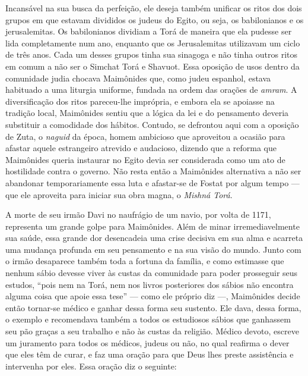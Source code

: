 Incansável na sua busca da perfeição, ele deseja também unificar os
ritos dos dois grupos em que estavam divididos os judeus do Egito, ou
seja, os babilonianos e os jerusalemitas. Os babilonianos dividiam a
Torá de maneira que ela pudesse ser lida completamente num ano,
enquanto que os Jerusalemitas utilizavam um ciclo de três anos. Cada um
desses grupos tinha sua sinagoga e não tinha outros ritos em comum a
não ser o Simchat Torá e Shavuot. Essa oposição de usos dentro da
comunidade judia chocava Maimônides que, como judeu espanhol, estava
habituado a uma liturgia uniforme, fundada na ordem das orações de
\emph{amram}. A diversificação dos ritos pareceu-lhe imprópria, e embora ela se
apoiasse na tradição local, Maimônides sentiu que a lógica da lei e do
pensamento deveria substituir a comodidade dos hábitos. Contudo, se
defrontou aqui com a oposição de Zuta, o \emph{naguid} da época, homem
ambicioso que aproveitou a ocasião para afastar aquele estrangeiro
atrevido e audacioso, dizendo que a reforma que Maimônides queria
instaurar no Egito devia ser considerada como um ato de hostilidade
contra o governo. Não resta então a Maimônides alternativa a não ser
abandonar temporariamente essa luta e afastar-se de Fostat por algum
tempo --- que ele aproveita para iniciar sua obra magna, o
\emph{Mishná Torá}.

A morte de seu irmão Davi no naufrágio de um navio, por volta de 1171,
representa um grande golpe para Maimônides. Além de minar
irremediavelmente sua saúde, essa grande dor desencadeia uma crise
decisiva em sua alma e acarreta uma mudança profunda em seu pensamento
e na sua visão do mundo. Junto com o irmão desaparece também
toda a fortuna da família, e
como estimasse que nenhum sábio devesse viver às custas da comunidade
para poder prosseguir seus estudos, ``pois nem na Torá, nem nos
livros posteriores dos sábios não encontra alguma coisa que apoie essa
tese'' --- como ele próprio diz ---, Maimônides decide então tornar-se
médico e ganhar dessa forma seu sustento. Ele dava, dessa forma, o
exemplo e recomendava também a todos os estudiosos sábios que ganhassem
seu pão graças a seu trabalho e não às custas da religião. Médico
devoto, escreve um juramento para todos os médicos, judeus ou não, no
qual reafirma o dever que eles têm de curar, e faz uma oração para que
Deus lhes preste assistência e intervenha por eles. Essa oração diz o
seguinte:

